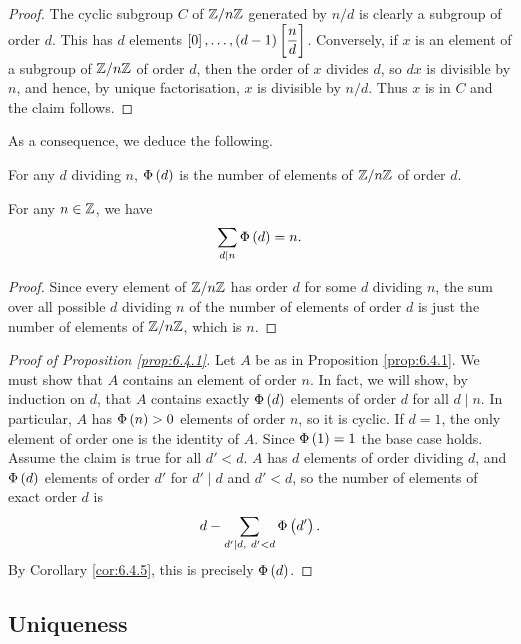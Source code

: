 \begin{proof}
The cyclic subgroup $ C $ of $ \mathbb{Z} / n\mathbb{Z} $ generated by $ n / d $ is clearly a subgroup of order $ d $. This has $ d $ elements $ \sbr{0}, \dots, \br{d - 1}\sbr{\dfrac{n}{d}} $. Conversely, if $ x $ is an element of a subgroup of $ \mathbb{Z} / n\mathbb{Z} $ of order $ d $, then the order of $ x $ divides $ d $, so $ dx $ is divisible by $ n $, and hence, by unique factorisation, $ x $ is divisible by $ n / d $. Thus $ x $ is in $ C $ and the claim follows.
\end{proof}

As a consequence, we deduce the following.

\begin{corollary}
For any $ d $ dividing $ n $, $ \Phi\br{d} $ is the number of elements of $ \mathbb{Z} / n\mathbb{Z} $ of order $ d $.
\end{corollary}

\begin{corollary}
\label{cor:6.4.5}
For any $ n \in \mathbb{Z} $, we have
$$ \sum_{d \mid n} \Phi\br{d} = n. $$
\end{corollary}

\begin{proof}
Since every element of $ \mathbb{Z} / n\mathbb{Z} $ has order $ d $ for some $ d $ dividing $ n $, the sum over all possible $ d $ dividing $ n $ of the number of elements of order $ d $ is just the number of elements of $ \mathbb{Z} / n\mathbb{Z} $, which is $ n $.
\end{proof}

\begin{proof}[Proof of Proposition \ref{prop:6.4.1}]
Let $ A $ be as in Proposition \ref{prop:6.4.1}. We must show that $ A $ contains an element of order $ n $. In fact, we will show, by induction on $ d $, that $ A $ contains exactly $ \Phi\br{d} $ elements of order $ d $ for all $ d \mid n $. In particular, $ A $ has $ \Phi\br{n} > 0 $ elements of order $ n $, so it is cyclic. If $ d = 1 $, the only element of order one is the identity of $ A $. Since $ \Phi\br{1} = 1 $ the base case holds. Assume the claim is true for all $ d' < d $. $ A $ has $ d $ elements of order dividing $ d $, and $ \Phi\br{d} $ elements of order $ d' $ for $ d' \mid d $ and $ d' < d $, so the number of elements of exact order $ d $ is
$$ d - \sum_{d' \mid d, \ d' < d} \Phi\br{d'}. $$
By Corollary \ref{cor:6.4.5}, this is precisely $ \Phi\br{d} $.
\end{proof}

\pagebreak

\subsection{Uniqueness}

